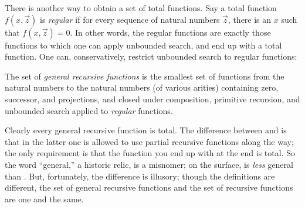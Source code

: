 \documentclass[../../../include/open-logic-section]{subfiles}
\begin{document}

There is another way to obtain a set of total functions. Say a total
function $f(x,\vec z)$ is \emph{regular} if for every sequence of
natural numbers $\vec z$, there is an $x$ such that $f(x,\vec z) = 0$.
In other words, the regular functions are exactly those functions to
which one can apply unbounded search, and end up with a total
function. One can, conservatively, restrict unbounded search to
regular functions:

\begin{defn}
The set of \emph{general recursive functions} is the smallest set of
functions from the natural numbers to the natural numbers (of various
arities) containing zero, successor, and projections, and closed under
composition, primitive recursion, and unbounded search applied to
\emph{regular} functions.
\end{defn}

Clearly every general recursive function is total. The difference
between  and
 is that in the latter one is allowed to
use partial recursive functions along the way; the only requirement is
that the function you end up with at the end is total. So the word
``general,'' a historic relic, is a misnomer; on the surface,
 is \emph{less} general than
. But, fortunately, the difference is
illusory; though the definitions are different, the set of general
recursive functions and the set of recursive functions are one and the
same.
\end{document}
